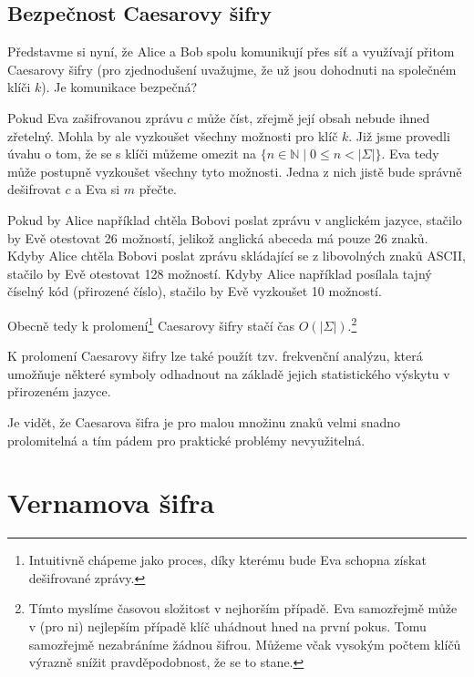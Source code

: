\documentclass[12pt]{article}
\begin{document}
    \subsection{Bezpečnost Caesarovy šifry}

        Představme si nyní, že Alice a Bob spolu komunikují přes síť a využívají přitom Caesarovy šifry
        (pro zjednodušení uvažujme, že už jsou dohodnuti na společném klíči $k$).
        Je komunikace bezpečná?

        Pokud Eva zašifrovanou zprávu $c$ může číst, zřejmě její obsah nebude ihned zřetelný. Mohla by ale
        vyzkoušet všechny možnosti pro klíč $k$. Již jsme provedli úvahu o tom, že se s klíči můžeme omezit na
        $\{n \in \mathbb{N} \mid 0 \leq n < |\Sigma|\}$. Eva tedy může postupně vyzkoušet všechny tyto
        možnosti. Jedna z nich jistě bude správně dešifrovat $c$ a Eva si $m$ přečte.

        \medskip

        Pokud by Alice například chtěla Bobovi poslat zprávu v anglickém jazyce,
        stačilo by Evě otestovat 26 možností, jelikož anglická abeceda má pouze 26 znaků.
        Kdyby Alice chtěla Bobovi poslat zprávu skládající se z libovolných znaků ASCII, stačilo by
        Evě otestovat 128 možností.
        Kdyby Alice například posílala tajný číselný kód (přirozené číslo), stačilo by Evě vyzkoušet 10 možností.

        Obecně tedy k prolomení\footnote{Intuitivně chápeme jako proces, díky kterému bude Eva schopna získat dešifrované zprávy.}
        Caesarovy šifry stačí čas $O(|\Sigma|)$.\footnote{Tímto myslíme časovou složitost v nejhorším případě.
        Eva samozřejmě může v (pro ni) nejlepším případě klíč uhádnout hned na první pokus. Tomu samozřejmě nezabráníme žádnou šifrou.
        Můžeme včak vysokým počtem klíčů výrazně snížit pravděpodobnost, že se to stane.}

        K prolomení Caesarovy šifry lze také použít tzv. frekvenční analýzu, která umožňuje některé
        symboly odhadnout na základě jejich statistického výskytu v přirozeném jazyce.

        Je vidět, že Caesarova šifra je pro malou množinu znaků velmi snadno prolomitelná a tím pádem pro praktické problémy nevyužitelná.


\section{Vernamova šifra}
\end{document}
